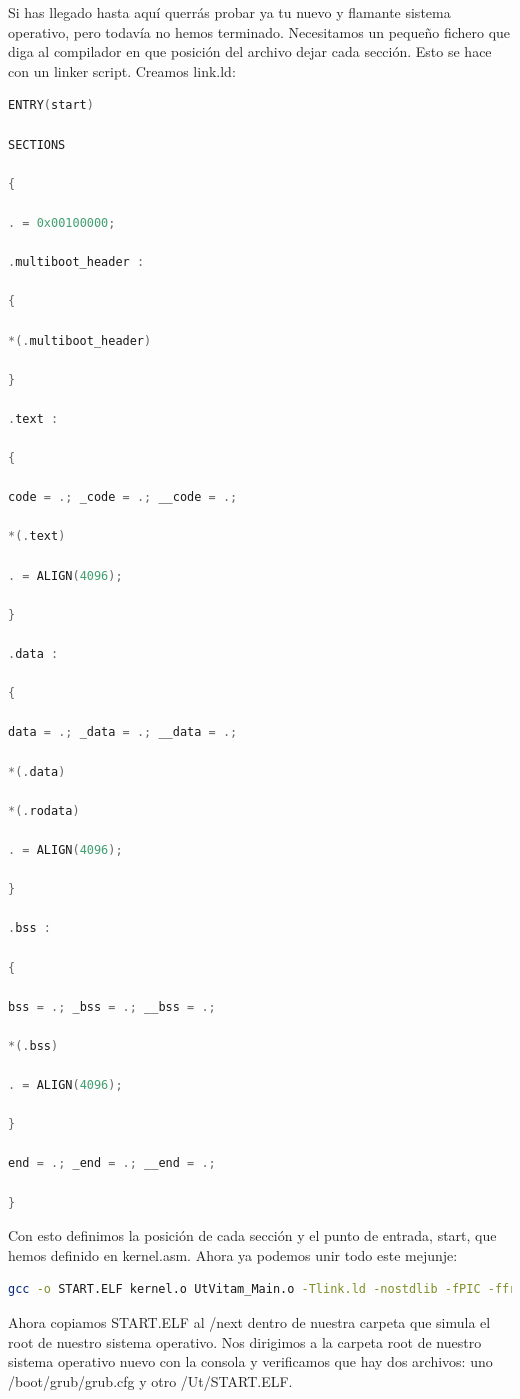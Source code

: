 \documentclass[12pt, twoside]{report}
\begin{document}
Si has llegado hasta aquí querrás probar ya tu nuevo y flamante sistema operativo, pero todavía no hemos terminado. Necesitamos un pequeño fichero que diga al compilador en que posición del archivo dejar cada sección. Esto se hace con un linker script. Creamos link.ld:

\begin{lstlisting}[language=C++]
ENTRY(start)

SECTIONS

{

. = 0x00100000;

.multiboot_header :

{

*(.multiboot_header)

}

.text :

{

code = .; _code = .; __code = .;

*(.text)

. = ALIGN(4096);

}

.data :

{

data = .; _data = .; __data = .;

*(.data)

*(.rodata)

. = ALIGN(4096);

}

.bss :

{

bss = .; _bss = .; __bss = .;

*(.bss)

. = ALIGN(4096);

}

end = .; _end = .; __end = .;

}
\end{lstlisting}

Con esto definimos la posición de cada sección y el punto de entrada, start, que hemos definido en kernel.asm. Ahora ya podemos unir todo este mejunje:

\begin{lstlisting}[language=bash]
gcc -o START.ELF kernel.o UtVitam_Main.o -Tlink.ld -nostdlib -fPIC -ffreestanding -lgcc
\end{lstlisting}

Ahora copiamos START.ELF al /next dentro de nuestra carpeta que simula el root de nuestro sistema operativo. Nos dirigimos a la carpeta root de nuestro sistema operativo nuevo con la consola y verificamos que hay dos archivos: uno /boot/grub/grub.cfg y otro /Ut/START.ELF.
\end{document}
